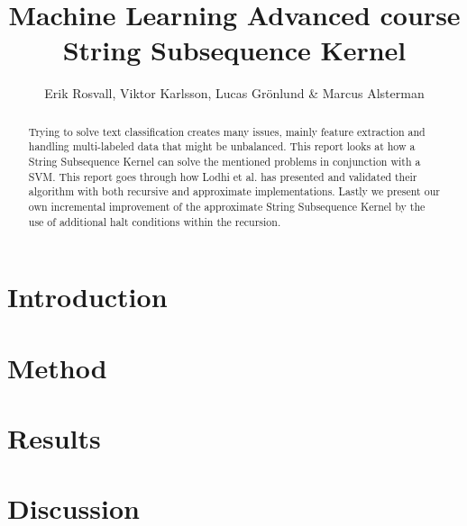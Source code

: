 \documentclass[10pt,a4paper]{article}
\author{Erik Rosvall, Viktor Karlsson, Lucas Grönlund \& Marcus Alsterman}
\title{Machine Learning Advanced course \\ String Subsequence Kernel}
\begin{document}
	\begin{titlingpage}
		\maketitle
		\begin{abstract}
			\noindent
			\begin{addmargin}[4em]{4em}
			Trying to solve text classification creates many issues, mainly feature extraction and handling multi-labeled data that might be unbalanced. This report looks at how a String Subsequence Kernel can solve the mentioned problems in conjunction with a SVM. This report goes through how Lodhi et al. has presented and validated their algorithm with both recursive and approximate implementations. Lastly we present our own incremental improvement of the approximate String Subsequence Kernel by the use of additional halt conditions within the recursion. 			
	\end{addmargin}
		\end{abstract}
	\end{titlingpage}
	
	\section{Introduction}
	
	
	\section{Method}
	

	\section{Results}
	
	
	\section{Discussion}
	
	
	
	
	
\end{document}
